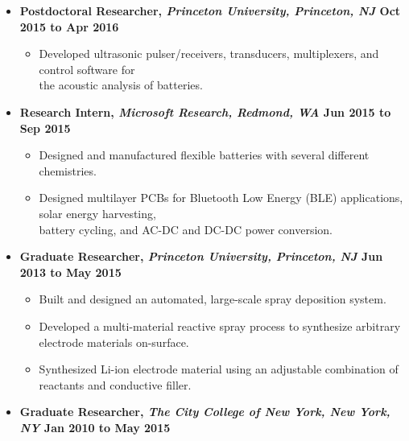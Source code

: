 \documentclass[9pt,letterpaper]{article}
\begin{document}
{{\begin{itemize}
  \item \noindent \textbf{Postdoctoral Researcher, \emph{Princeton University, Princeton, NJ} \hfill {\scriptsize Oct 2015 to Apr 2016}}
    {\footnotesize\begin{itemize} 
        \item Developed ultrasonic pulser/receivers, transducers, multiplexers, and control software for \\the acoustic analysis of batteries.
    \end{itemize}}
  \item \noindent \textbf{Research Intern, \emph{Microsoft Research, Redmond, WA} \hfill {\scriptsize Jun 2015 to Sep 2015}}
    {\footnotesize\begin{itemize} 
        \item Designed and manufactured flexible batteries with several different chemistries.
        \item Designed multilayer PCBs for Bluetooth Low Energy (BLE) applications, solar energy harvesting, \\battery cycling, and AC-DC and DC-DC power conversion.
    \end{itemize}}
  \item \noindent \textbf{Graduate Researcher, \emph{Princeton University, Princeton, NJ} \hfill {\scriptsize Jun 2013 to May 2015}}
    {\footnotesize\begin{itemize} 
        \item Built and designed an automated, large-scale spray deposition system.
        \item Developed a multi-material reactive spray process to synthesize arbitrary electrode materials on-surface.
        \item Synthesized Li-ion electrode material using an adjustable combination of reactants and conductive filler.
    \end{itemize}}
  \item \noindent \textbf{Graduate Researcher, \emph{The City College of New York, New York, NY} \hfill {\scriptsize Jan 2010 to May 2015}}

\end{itemize}}}
\end{document}
